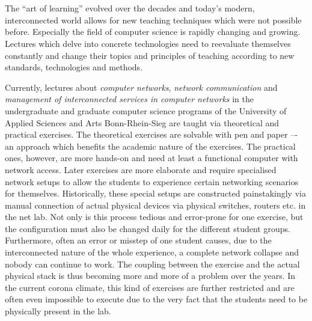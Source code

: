 \section*{}
%
The \enquote{art of learning} evolved over the decades and today's modern, interconnected world allows for new teaching techniques which were not possible before.
Especially the field of computer science is rapidly changing and growing. 
Lectures which delve into concrete technologies need to reevaluate
themselves constantly and change their topics and principles of teaching according to new standards, technologies and methods.

Currently, lectures about \emph{computer networks}, \emph{network communication} and \emph{management of interconnected services in computer networks} in the undergraduate and graduate computer science programs of the University of Applied Sciences and Arts Bonn-Rhein-Sieg
are taught via theoretical and practical exercises.
The theoretical exercises are solvable with pen and paper –- an approach which benefits the academic nature of the exercises.
The practical ones, however, are more hands-on and need at least a functional computer with network access.
Later exercises are more elaborate and require specialised network setups to allow the students to experience certain networking scenarios for themselves. 
Historically, these special setups are constructed painstakingly via manual connection of actual physical devices via physical switches, routers etc. in the net lab.
Not only is this process tedious and error-prone for one exercise, 
but the configuration must also be changed daily for the different student groups.
Furthermore, often an error or misstep of one student causes,
due to the interconnected nature of the whole experience, a complete network collapse and nobody can continue to work.
The coupling between the exercise and the actual physical stack
is thus becoming more and more of a problem over the years.
In the current corona climate, this kind of exercises are further restricted and are often even impossible to execute due to the very fact that the students need to be physically present in the lab.

